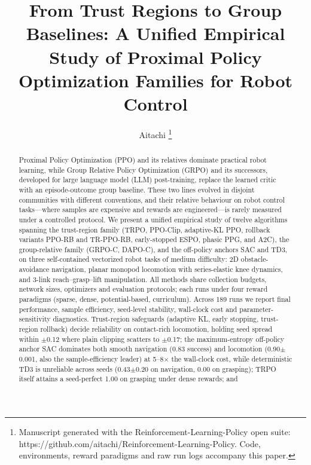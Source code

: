 \documentclass[journal,twoside]{IEEEtran}
\newcommand{\ppo}{\textsc{PPO}}
\newcommand{\trpo}{\textsc{TRPO}}
\newcommand{\grpo}{\textsc{GRPO-C}}
\newcommand{\dapo}{\textsc{DAPO-C}}
\begin{document}
\title{From Trust Regions to Group Baselines: A Unified Empirical Study of
Proximal Policy Optimization Families for Robot Control}

\author{Aitachi%
\thanks{Manuscript generated with the Reinforcement-Learning-Policy open
suite: https://github.com/aitachi/Reinforcement-Learning-Policy. Code,
environments, reward paradigms and raw run logs accompany this paper.}}

\maketitle

\begin{abstract}
Proximal Policy Optimization (\ppo{}) and its relatives dominate practical
robot learning, while Group Relative Policy Optimization (GRPO) and its
successors, developed for large language model (LLM) post-training, replace
the learned critic with an episode-outcome group baseline. These two lines
evolved in disjoint communities with different conventions, and their
relative behaviour on robot control tasks---where samples are expensive and
rewards are engineered---is rarely measured under a controlled protocol. We
present a unified empirical study of twelve algorithms spanning the
trust-region family (\trpo{}, \ppo{}-Clip, adaptive-KL \ppo{}, rollback
variants \ppo{}-RB and TR-\ppo{}-RB, early-stopped ESPO, phasic PPG, and A2C),
the group-relative family (\grpo{}, \dapo{}), and the off-policy anchors
SAC and TD3, on three self-contained vectorized robot tasks of medium difficulty:
2D obstacle-avoidance navigation, planar monopod locomotion with
series-elastic knee dynamics, and 3-link reach--grasp--lift manipulation.
All methods share collection budgets, network sizes, optimizers and
evaluation protocols; each runs under four reward paradigms (sparse, dense,
potential-based, curriculum). Across 189 runs we report final performance,
sample efficiency, seed-level stability, wall-clock cost and
parameter-sensitivity diagnostics. Trust-region safeguards (adaptive KL,
early stopping, trust-region rollback) decide reliability on
contact-rich locomotion, holding seed spread within $\pm$0.12 where plain
clipping scatters to $\pm$0.17; the maximum-entropy off-policy anchor SAC
dominates both smooth navigation (0.83 success) and locomotion
(0.90$\pm$0.001, also the sample-efficiency leader) at 5--8$\times$ the
wall-clock cost, while deterministic TD3 is unreliable across seeds
(0.43$\pm$0.20 on navigation, 0.00 on grasping); \trpo{} itself attains a
seed-perfect 1.00 on grasping under dense rewards; and

\end{abstract}
\end{document}
